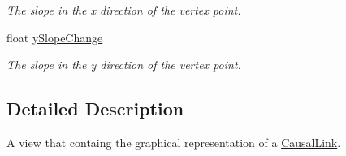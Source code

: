 \begin{DoxyCompactItemize}
\begin{DoxyCompactList}\small\item\em The slope in the x direction of the vertex point. \end{DoxyCompactList}\item 
\hypertarget{interface_causal_link_view_aaa52b4622b33e322e70bdc03892a38e7}{float \hyperlink{interface_causal_link_view_aaa52b4622b33e322e70bdc03892a38e7}{y\-Slope\-Change}}\label{interface_causal_link_view_aaa52b4622b33e322e70bdc03892a38e7}

\begin{DoxyCompactList}\small\item\em The slope in the y direction of the vertex point. \end{DoxyCompactList}\end{DoxyCompactItemize}


\subsection{Detailed Description}
A view that containg the graphical representation of a \hyperlink{interface_causal_link}{Causal\-Link}. 

